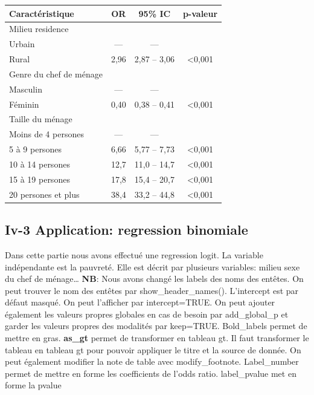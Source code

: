 \documentclass[
]{article}
\begin{document}
\begin{longtable}[]{@{}lccc@{}}
\toprule\noalign{}
\textbf{Caractéristique} & \textbf{OR} & \textbf{95\% IC} &
\textbf{p-valeur} \\
\midrule\noalign{}
\endhead
\bottomrule\noalign{}
\endlastfoot
Milieu residence & & & \\
Urbain & --- & --- & \\
Rural & 2,96 & 2,87 -- 3,06 & \textless0,001 \\
Genre du chef de ménage & & & \\
Masculin & --- & --- & \\
Féminin & 0,40 & 0,38 -- 0,41 & \textless0,001 \\
Taille du ménage & & & \\
Moins de 4 persones & --- & --- & \\
5 à 9 persones & 6,66 & 5,77 -- 7,73 & \textless0,001 \\
10 à 14 persones & 12,7 & 11,0 -- 14,7 & \textless0,001 \\
15 à 19 persones & 17,8 & 15,4 -- 20,7 & \textless0,001 \\
20 persones et plus & 38,4 & 33,2 -- 44,8 & \textless0,001 \\
\end{longtable}

\hypertarget{iv-3-application-regression-binomiale}{%
\subsection{Iv-3 Application: regression
binomiale}\label{iv-3-application-regression-binomiale}}

Dans cette partie nous avons effectué une regression logit. La variable
indépendante est la pauvreté. Elle est décrit par plusieurs variables:
milieu sexe du chef de ménage\ldots{} \textbf{NB}: Nous avons changé les
labels des noms des entêtes. On peut trouver le nom des entêtes par
show\_header\_names(). L'intercept est par défaut masqué. On peut
l'afficher par intercept=TRUE. On peut ajouter également les valeurs
propres globales en cas de besoin par add\_global\_p et garder les
valeurs propres des modalités par keep=TRUE. Bold\_labels permet de
mettre en gras. \textbf{as\_gt} permet de transformer en tableau gt. Il
faut transformer le tableau en tableau gt pour pouvoir appliquer le
titre et la source de donnée. On peut également modifier la note de
table avec modify\_footnote. Label\_number permet de mettre en forme les
coefficients de l'odds ratio. label\_pvalue met en forme la pvalue
\end{document}
